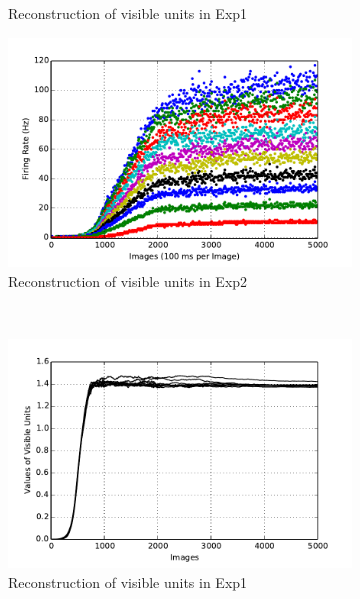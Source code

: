 \begin{figure}
\begin{subfigure}[t]{0.4\textwidth}
			\caption{Reconstruction of visible units in Exp1}
		\end{subfigure}
		\begin{subfigure}[t]{0.4\textwidth}
			\includegraphics[width=\textwidth]{pics_ae/exp2_recon_s_decay.pdf}
			\caption{Reconstruction of visible units in Exp2}
		\end{subfigure}\\
		\begin{subfigure}[t]{0.4\textwidth}
			\includegraphics[width=\textwidth]{pics_ae/exp1_recon_nons_decay.pdf}
			\caption{Reconstruction of visible units in Exp1}
		\end{subfigure}
		\begin{subfigure}[t]{0.4\textwidth}

\end{subfigure}
\end{figure}
